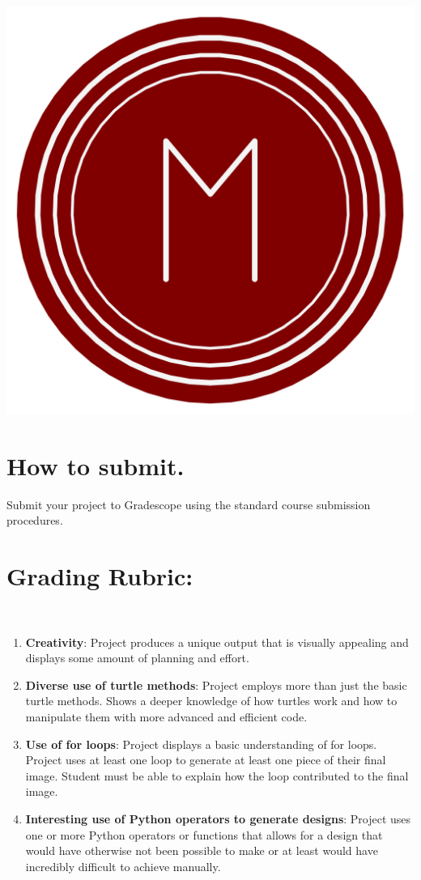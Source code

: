 \documentclass[11pt, letterpaper, onecolumn, oneside, final]{article}
\begin{document}
\begin{center}
\includegraphics[scale=.5]{turtle2.jpg}

\end{center}
    \section{How to submit.}

    Submit your project to Gradescope using the standard course submission procedures. 
    \newpage
    \section{Grading Rubric:}  \\
    \begin{enumerate}
        \item \textbf{Creativity}: Project produces a unique output that is visually appealing and displays some amount of planning and effort.
        \item \textbf{Diverse use of turtle methods}: Project employs more than just the basic turtle methods. Shows a deeper knowledge of how turtles work and how to manipulate them with more advanced and efficient code.
        \item \textbf{Use of for loops}: Project displays a basic understanding of for loops. Project uses at least one loop to generate at least one piece of their final image. Student must be able to explain how the loop contributed to the final image.
        \item \textbf{Interesting use of Python operators to generate designs}: Project uses one or more Python operators or functions that allows for a design that would have otherwise not been possible to make or at least would have incredibly difficult to achieve manually. 

        
    \end{enumerate}
\end{document}
